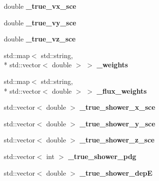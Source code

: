 \begin{DoxyCompactItemize}
\item 
\hypertarget{group__lee_ga8a638838ed9a1cde42fd00a198c3521b}{double {\bfseries \-\_\-true\-\_\-vx\-\_\-sce}}\label{group__lee_ga8a638838ed9a1cde42fd00a198c3521b}

\item 
\hypertarget{group__lee_ga1ea9a05e0b69aca1c22072cae8482b81}{double {\bfseries \-\_\-true\-\_\-vy\-\_\-sce}}\label{group__lee_ga1ea9a05e0b69aca1c22072cae8482b81}

\item 
\hypertarget{group__lee_ga5ac99bc027e85044950f2f502d3fffb0}{double {\bfseries \-\_\-true\-\_\-vz\-\_\-sce}}\label{group__lee_ga5ac99bc027e85044950f2f502d3fffb0}

\item 
\hypertarget{group__lee_ga114a52d8c3bfec336e931f1d4d8e6687}{std\-::map$<$ std\-::string, \\*
std\-::vector$<$ double $>$ $>$ {\bfseries \-\_\-weights}}\label{group__lee_ga114a52d8c3bfec336e931f1d4d8e6687}

\item 
\hypertarget{group__lee_ga5d5ebf6e8ca021c662ee2589ebf13f46}{std\-::map$<$ std\-::string, \\*
std\-::vector$<$ double $>$ $>$ {\bfseries \-\_\-flux\-\_\-weights}}\label{group__lee_ga5d5ebf6e8ca021c662ee2589ebf13f46}

\item 
\hypertarget{group__lee_ga5a4c4d805d124adaddb51a03be0af692}{std\-::vector$<$ double $>$ {\bfseries \-\_\-true\-\_\-shower\-\_\-x\-\_\-sce}}\label{group__lee_ga5a4c4d805d124adaddb51a03be0af692}

\item 
\hypertarget{group__lee_ga2509960b89cf002d160e0c298575eafd}{std\-::vector$<$ double $>$ {\bfseries \-\_\-true\-\_\-shower\-\_\-y\-\_\-sce}}\label{group__lee_ga2509960b89cf002d160e0c298575eafd}

\item 
\hypertarget{group__lee_gacb0f3d491c4acf888d0a787624627b57}{std\-::vector$<$ double $>$ {\bfseries \-\_\-true\-\_\-shower\-\_\-z\-\_\-sce}}\label{group__lee_gacb0f3d491c4acf888d0a787624627b57}

\item 
\hypertarget{group__lee_gac1f312260669f165f847286e4512224d}{std\-::vector$<$ int $>$ {\bfseries \-\_\-true\-\_\-shower\-\_\-pdg}}\label{group__lee_gac1f312260669f165f847286e4512224d}

\item 
\hypertarget{group__lee_ga4f376ec3a74610d2b6e5ea3be722182c}{std\-::vector$<$ double $>$ {\bfseries \-\_\-true\-\_\-shower\-\_\-dep\-E}}\label{group__lee_ga4f376ec3a74610d2b6e5ea3be722182c}


\end{DoxyCompactItemize}
